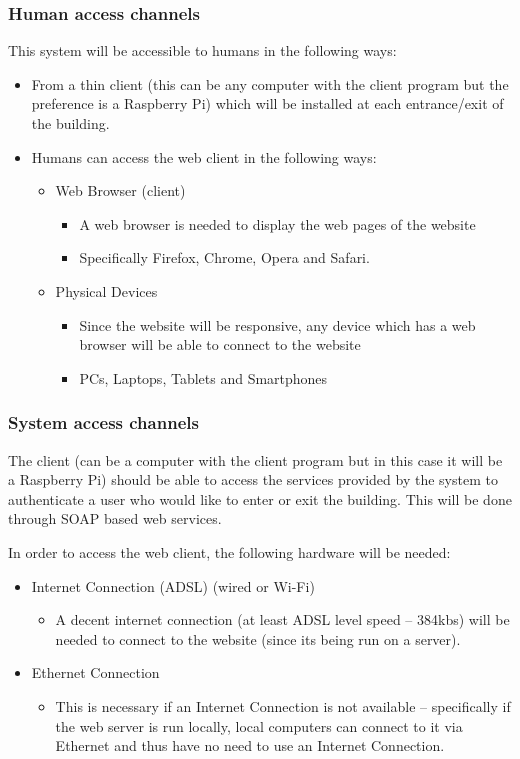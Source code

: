 \subsubsection{Human access channels}
This system will be accessible to humans in the following ways:

	\begin{itemize}
		\item From a thin client (this can be any computer with the client program but the preference is a Raspberry Pi) which will be installed at each entrance/exit of the building.
		\item Humans can access the web client in the following ways:
		\begin{itemize}
			\item Web Browser (client)
				\begin{itemize}
					\item A web browser is needed to display the web pages of the website
					\item Specifically Firefox, Chrome, Opera and Safari.
				\end{itemize}
			\item Physical Devices
			\begin{itemize}
				\item Since the website will be responsive, any device which has a web browser will be able to connect to the website
				\item PCs, Laptops, Tablets and Smartphones
			\end{itemize}
		\end{itemize}
	\end{itemize}
	
\subsubsection{System access channels}
The client (can be a computer with the client program but in this case it will be a Raspberry Pi) should be able to access the services provided by the system to authenticate a user who would like to enter or exit the building. This will be done through SOAP based web services.

In order to access the web client, the following hardware will be needed:
\begin{itemize}
	\item Internet Connection (ADSL) (wired or Wi-Fi)
	\begin{itemize}
		\item A decent internet connection (at least ADSL level speed – 384kbs) will be needed to connect to the website (since its being run on a server).
	\end{itemize}
	\item Ethernet Connection
	\begin{itemize}
		\item This is necessary if an Internet Connection is not available – specifically if the web server is run locally, local computers can connect to it via Ethernet and thus have no need to use an Internet Connection.
	\end{itemize}
\end{itemize}

